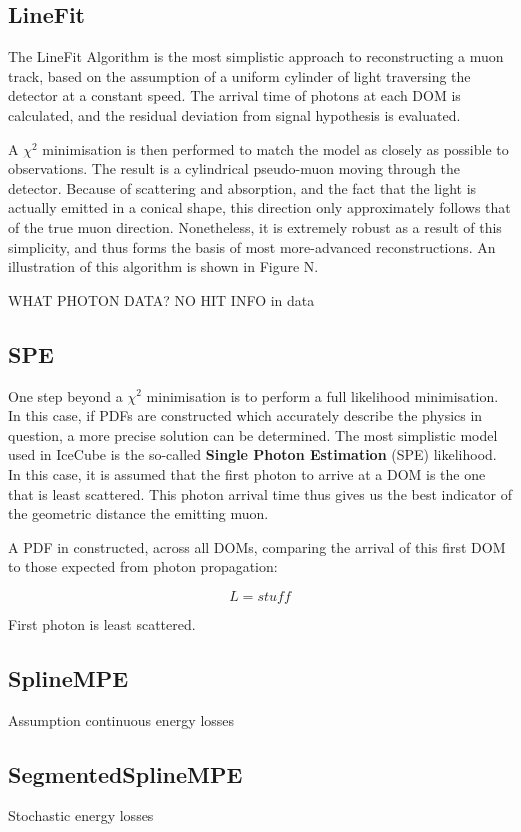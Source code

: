 \subsection{LineFit}
The LineFit Algorithm is the most simplistic approach to reconstructing a muon track, based on the assumption of a uniform cylinder of light traversing the detector at a constant speed. The arrival time of photons at each DOM is calculated, and the residual deviation from signal hypothesis is evaluated.

A $\chi^{2}$ minimisation is then performed to match the model as closely as possible to observations. The result is a cylindrical pseudo-muon moving through the detector. Because of scattering and absorption, and the fact that the light is actually emitted in a conical shape, this direction only approximately follows that of the true muon direction. Nonetheless, it is extremely robust as a result of this simplicity, and thus forms the basis of most more-advanced reconstructions. An illustration of this algorithm is shown in Figure N.

WHAT PHOTON DATA?
NO HIT INFO in data
\subsection{SPE}

One step beyond a $\chi^{2}$ minimisation is to perform a full likelihood minimisation. In this case, if PDFs are constructed which accurately describe the physics in question, a more precise solution can be determined. The most simplistic model used in IceCube is the so-called \textbf{Single Photon Estimation} (SPE) likelihood. In this case, it is assumed that the first photon to arrive at a DOM is the one that is least scattered. This photon arrival time thus gives us the best indicator of the geometric distance the emitting muon. 

A PDF in constructed, across all DOMs, comparing the arrival of this first DOM to those expected from photon propagation:

\[ L = stuff \]

First photon is least scattered.
\subsection{SplineMPE}
Assumption continuous energy losses
\subsection{SegmentedSplineMPE}
Stochastic energy losses
